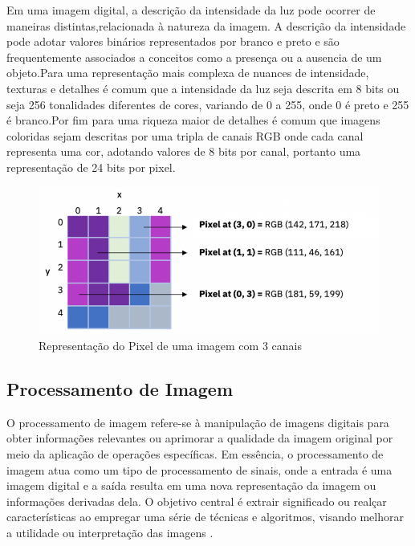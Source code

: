 Em uma imagem digital, a descrição da intensidade da luz pode ocorrer de maneiras distintas,relacionada à natureza da imagem. A descrição da intensidade pode adotar valores binários representados por branco e preto e são frequentemente associados a conceitos como a presença ou a ausencia de um objeto.Para  uma representação mais complexa de nuances de intensidade, texturas e detalhes é comum  que a intensidade da luz seja descrita em 8 bits ou seja 256 tonalidades diferentes de cores, variando de 0 a 255, onde 0 é preto e 255 é branco.Por fim para uma riqueza maior de detalhes é comum que imagens coloridas sejam descritas por uma tripla de canais \ac{RGB}  onde cada canal representa uma  cor, adotando valores de 8 bits por canal, portanto uma representação de 24 bits por pixel\cite{imagemIBM}.

\begin{figure}[!htb]
	\centering
	\includegraphics[scale=1]{figuras/processamento_imagem/pixel.png}
	\caption{Representação do Pixel de uma imagem com 3 canais}
	\label{fig:Representacao do Pixel de uma imagem com 3 canais}
\end{figure}



\subsection[Processamento de Imagem]{Processamento de Imagem}

O processamento de imagem refere-se à manipulação de imagens digitais para obter informações relevantes ou aprimorar a qualidade da imagem original por meio da aplicação de operações específicas. Em essência, o processamento de imagem atua como um tipo de processamento de sinais, onde a entrada é uma imagem digital e a saída resulta em uma nova representação da imagem ou informações derivadas dela. O objetivo central é extrair significado ou realçar características ao empregar uma série de técnicas e algoritmos, visando melhorar a utilidade ou interpretação das imagens \cite{imagemIBM}.

